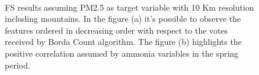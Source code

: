 \begin{figure}[H]
\centering
{}\\
\caption{FS results assuming PM2.5 as target variable with 10 Km resolution including mountains. In the figure (a) it's possible to observe the features ordered in decreasing order with respect to the votes received by Borda Count algorithm. The figure (b) highlights the positive correlation assumed by ammonia variables in the spring period. }
\label{fig:fs_pm25}
\end{figure}

